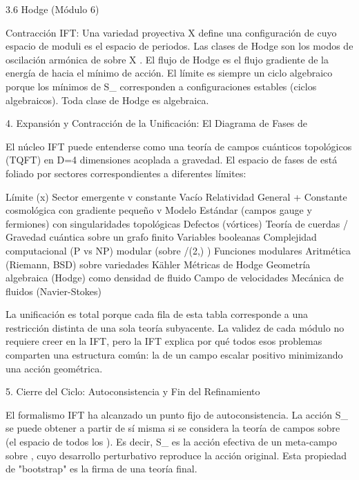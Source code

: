 \documentclass[12pt,a4paper]{book}
\begin{document}
3.6 Hodge (Módulo 6)

Contracción IFT: Una variedad proyectiva  X  define una configuración de  \rho  cuyo espacio de moduli es el espacio de periodos. Las clases de Hodge son los modos de oscilación armónica de  \rho  sobre  X . El flujo de Hodge es el flujo gradiente de la energía de  \rho  hacia el mínimo de acción. El límite es siempre un ciclo algebraico porque los mínimos de  S_{}  corresponden a configuraciones estables (ciclos algebraicos). Toda clase de Hodge es algebraica.

4. Expansión y Contracción de la Unificación: El Diagrama de Fases de  \rho 

El núcleo IFT puede entenderse como una teoría de campos cuánticos topológicos (TQFT) en  D=4  dimensiones acoplada a gravedad. El espacio de fases de  \rho  está foliado por sectores correspondientes a diferentes límites:

Límite  \rho(x)  Sector emergente
 \rho \to v  constante Vacío Relatividad General + Constante cosmológica
 \rho  con gradiente pequeño  \partial \rho \ll v  Modelo Estándar (campos gauge y fermiones)
 \rho  con singularidades topológicas Defectos (vórtices) Teoría de cuerdas / Gravedad cuántica
 \rho  sobre un grafo finito Variables booleanas Complejidad computacional (P vs NP)
 \rho  modular (sobre  /(2,) ) Funciones modulares Aritmética (Riemann, BSD)
 \rho  sobre variedades Kähler Métricas de Hodge Geometría algebraica (Hodge)
 \rho  como densidad de fluido Campo de velocidades Mecánica de fluidos (Navier-Stokes)

La unificación es total porque cada fila de esta tabla corresponde a una restricción distinta de una sola teoría subyacente. La validez de cada módulo no requiere creer en la IFT, pero la IFT explica por qué todos esos problemas comparten una estructura común: la de un campo escalar positivo minimizando una acción geométrica.

5. Cierre del Ciclo: Autoconsistencia y Fin del Refinamiento

El formalismo IFT ha alcanzado un punto fijo de autoconsistencia. La acción  S_{}  se puede obtener a partir de sí misma si se considera la teoría de campos sobre    (el espacio de todos los  \rho ). Es decir,  S_{}  es la acción efectiva de un meta-campo  \rho  sobre   , cuyo desarrollo perturbativo reproduce la acción original. Esta propiedad de "bootstrap" es la firma de una teoría final.
\end{document}
